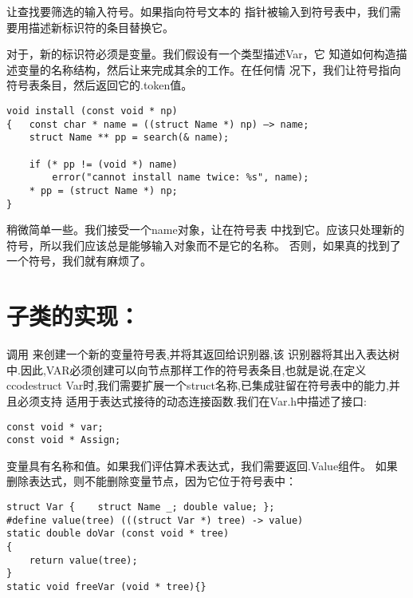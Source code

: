    让查找要筛选的输入符号。如果指向符号文本的
指针被输入到符号表中，我们需要用描述新标识符的条目替换它。

    对于，新的标识符必须是变量。我们假设有一个类型描述Var，它
知道如何构造描述变量的名称结构，然后让来完成其余的工作。在任何情
况下，我们让符号指向符号表条目，然后返回它的.token值。

\begin{lstlisting}
void install (const void * np) 
{   const char * name = ((struct Name *) np) —> name; 
    struct Name ** pp = search(& name); 
    
    if (* pp != (void *) name) 
        error("cannot install name twice: %s", name); 
    * pp = (struct Name *) np; 
}
\end{lstlisting}

    稍微简单一些。我们接受一个name对象，让在符号表
中找到它。应该只处理新的符号，所以我们应该总是能够输入对象而不是它的名称。
否则，如果真的找到了一个符号，我们就有麻烦了。

\section{子类的实现：}

     调用  来创建一个新的变量符号表,并将其返回给识别器,该
识别器将其出入表达树中.因此,VAR必须创建可以向节点那样工作的符号表条目,也就是说,在定义
\\ccode{struct Var}时,我们需要扩展一个struct名称,已集成驻留在符号表中的能力,并且必须支持
适用于表达式接待的动态连接函数.我们在Var.h中描述了接口:

\begin{lstlisting}
const void * var;
const void * Assign;
\end{lstlisting}

    变量具有名称和值。如果我们评估算术表达式，我们需要返回.Value组件。
如果删除表达式，则不能删除变量节点，因为它位于符号表中：

\begin{lstlisting}
struct Var {    struct Name _; double value; };
#define value(tree) (((struct Var *) tree) -> value)
static double doVar (const void * tree)
{
    return value(tree);
}
static void freeVar (void * tree){}
\end{lstlisting}

